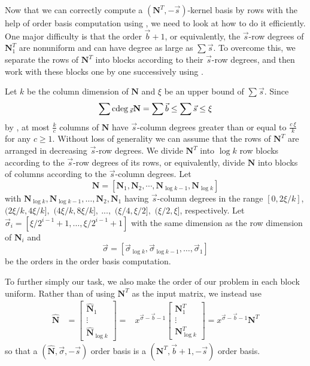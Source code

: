 Now that we can correctly compute a $\left(\mathbf{N}^{T},-\vec{s}\right)$-kernel
basis by rows with the help of order basis computation using ,
we need to look at how to do it efficiently. One major difficulty
is that the order $\vec{b}+1$, or equivalently, the $\vec{s}$-row
degrees of $\mathbf{N}_{1}^{T}$ are nonuniform and can have degree
as large as $\sum\vec{s}$. To overcome this, we separate the rows
of $\mathbf{N}^{T}$ into blocks according to their $\vec{s}$-row
degrees, and then work with these blocks one by one successively using
. 



Let $k$ be the column dimension of $\mathbf{N}$ and $\xi$ be an
upper bound of $\sum\vec{s}$. Since 
\[
\sum{\rm cdeg}\,_{\vec{s}}\mathbf{N}=\sum\vec{b}\le\sum\vec{s}\le\xi
\]
 by , at most
$\frac{k}{c}$ columns of $\mathbf{N}$ have $\vec{s}$-column degrees
greater than or equal to $\frac{c~\xi}{k}$ for any $c\ge1$. Without
loss of generality we can assume that the rows of $\mathbf{N}^{T}$
are arranged in decreasing $\vec{s}$-row degrees. We divide $\mathbf{N}^{T}$
into $\log k$ row blocks according to the $\vec{s}$-row degrees
of its rows, or equivalently, divide $\mathbf{N}$ into blocks of
columns according to the $\vec{s}$-column degrees. Let 
\[
\mathbf{N}=\left[\mathbf{N}_{1},\mathbf{N}_{2},\cdots,\mathbf{N}_{\log k-1},\mathbf{N}_{\log k}\right]
\]
with $\mathbf{N}_{\log k},\mathbf{N}_{\log k-1},\dots,\mathbf{N}_{2},\mathbf{N}_{1}$
having $\vec{s}$-column degrees in the range $\left[0,2\xi/k\right]$,
$(2\xi/k,4\xi/k],$ $(4\xi/k,8\xi/k],\ ...,$ $(\xi/4,\xi/2],$ $(\xi/2,\xi]$,
respectively.
Let $\vec{\sigma}_{i}=\left[\xi/2^{i-1}+1,\dots,\xi/2^{i-1}+1\right]$
with the same dimension as the row dimension of $\mathbf{N}_{i}$
and 
\[
\vec{\sigma}=\left[\vec{\sigma}_{\log k},\vec{\sigma}_{\log k-1},\dots,\vec{\sigma}_{1}\right]
\]
 be the orders in the order basis computation.

To further simply our task, we also make the order of our problem
in each block uniform. Rather than of using $\mathbf{N}^{T}$ as the
input matrix, we instead use 
\begin{eqnarray*}
\hat{\mathbf{N}} & =\begin{bmatrix}\hat{\mathbf{N}}_{1}\\
\vdots\\
\hat{\mathbf{N}}_{\log k}
\end{bmatrix}= & x^{\vec{\sigma}-\vec{b}-1}\begin{bmatrix}\mathbf{N}_{1}^{T}\\
\vdots\\
\mathbf{N}_{\log k}^{T}
\end{bmatrix}=x^{\vec{\sigma}-\vec{b}-1}\mathbf{N}^{T}
\end{eqnarray*}
so that a $\left(\hat{\mathbf{N}},\vec{\sigma},-\vec{s}\right)$ order
basis is a $\left(\mathbf{N}^{T},\vec{b}+1,-\vec{s}\right)$ order
basis.

